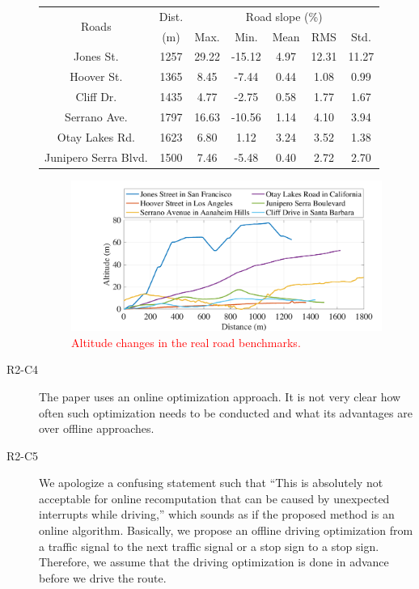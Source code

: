 \documentclass[onecolumn]{IEEEconf}
\begin{document}
\begin{description}
\begin{table} [h!]
\centering
\label{table:road_bench}
\begin{tabular}{|c|c|c|c|c|c|c|}  \hline
\multirow{2}{*}{Roads} 
				&Dist.		&\multicolumn{5}{|c|}{Road slope (\%)}  \\ \cline{3-7}
				&(m)		 	&Max.		&Min. 	&Mean		&RMS 	&Std.	\\ \hline
Jones St. 	&1257		&29.22		&-15.12	&4.97 		&12.31 	&11.27	\\ \hline
Hoover St. 	&1365		&8.45		&-7.44	&0.44		&1.08 	&0.99	\\ \hline
Cliff Dr. 	&1435		&4.77		&-2.75	&0.58		&1.77 	&1.67	\\ \hline
Serrano Ave.		&1797		&16.63		&-10.56	&1.14 		&4.10 	&3.94	\\ \hline
Otay Lakes Rd.		&1623		&6.80		&1.12	&3.24		&3.52 	&1.38	\\ \hline
Junipero Serra Blvd.	&1500		&7.46		&-5.48	&0.40		&2.72 	&2.70	\\ \hline
\end{tabular}
\end{table}


\begin{figure} [h!]	 %
\centering
\renewcommand\thefigure{8}
\includegraphics[width=0.7\hsize]{Figures/Benchmark_altitude.pdf}
\caption{\textcolor{red}{Altitude changes in the real road benchmarks.}}
\label{fig:bench_altitude}
\end{figure} 


\item [R2-C4] The paper uses an online optimization approach. It is not very clear how often such optimization needs to be conducted and what its advantages are over offline approaches.

\item [R2-C5] We apologize a confusing statement such that ``This is absolutely not acceptable for online recomputation that can be caused by unexpected interrupts while driving,'' which sounds as if the proposed method is an online algorithm. Basically, we propose an offline driving optimization from a traffic signal to the next traffic signal or  a stop sign to a stop sign. Therefore, we assume that the driving optimization is done in advance before we drive the route.


\end{description}
\end{document}
